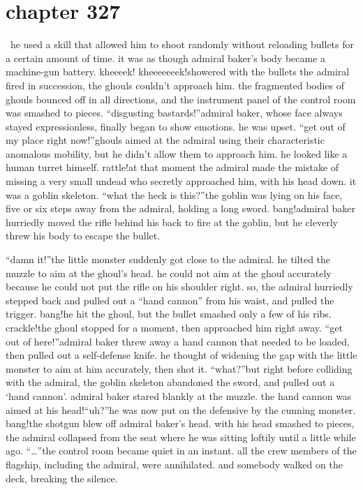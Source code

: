 \section{chapter 327}






 he used a skill that allowed him to shoot randomly without reloading bullets for a certain amount of time.
 it was as though admiral baker’s body became a machine-gun battery.
kheeeek! kheeeeeeek!showered with the bullets the admiral fired in succession, the ghouls couldn’t approach him.
the fragmented bodies of ghouls bounced off in all directions, and the instrument panel of the control room was smashed to pieces.
“disgusting bastards!”admiral baker, whose face always stayed expressionless, finally began to show emotions.
he was upset.
“get out of my place right now!”ghouls aimed at the admiral using their characteristic anomalous mobility, but he didn’t allow them to approach him.
 he looked like a human turret himself.
rattle!at that moment the admiral made the mistake of missing a very small undead who secretly approached him, with his head down.
it was a goblin skeleton.
“what the heck is this?”the goblin was lying on his face, five or six steps away from the admiral, holding a long sword.
bang!admiral baker hurriedly moved the rifle behind his back to fire at the goblin, but he cleverly threw his body to escape the bullet.

“damn it!”the little monster suddenly got close to the admiral.
 he tilted the muzzle to aim at the ghoul’s head.
 he could not aim at the ghoul accurately because he could not put the rifle on his shoulder right.
 so, the admiral hurriedly stepped back and pulled out a “hand cannon” from his waist, and pulled the trigger.
bang!he hit the ghoul, but the bullet smashed only a few of his ribs.
crackle!the ghoul stopped for a moment, then approached him right away.
“get out of here!”admiral baker threw away a hand cannon that needed to be loaded, then pulled out a self-defense knife.
 he thought of widening the gap with the little monster to aim at him accurately, then shot it.
“what?”but right before colliding with the admiral, the goblin skeleton abandoned the sword, and pulled out a ‘hand cannon’.
admiral baker stared blankly at the muzzle.
 the hand cannon was aimed at his head!“uh?”he was now put on the defensive by the cunning monster.
bang!the shotgun blew off admiral baker’s head.
 with his head smashed to pieces, the admiral collapsed from the seat where he was sitting loftily until a little while ago.
“…”the control room became quiet in an instant.
 all the crew members of the flagship, including the admiral, were annihilated.
 and somebody walked on the deck, breaking the silence.

